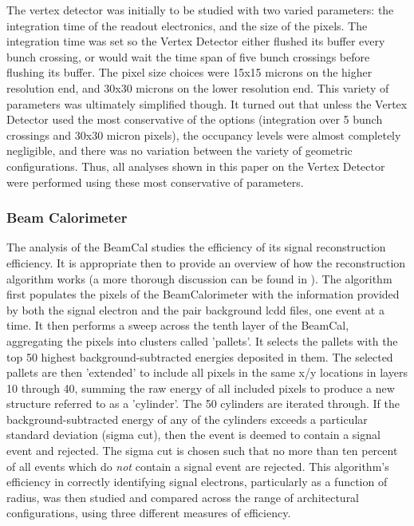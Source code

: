 \documentclass{report}
\begin{document}
                    The vertex detector was initially to be studied with two varied parameters: the integration time of the readout electronics, and the size of the pixels. The integration time was set so the Vertex Detector either flushed its buffer every bunch crossing, or would wait the time span of five bunch crossings before flushing its buffer. The pixel size choices were 15x15 microns on the higher resolution end, and 30x30 microns on the lower resolution end. This variety of parameters was ultimately simplified though. It turned out that unless the Vertex Detector used the most conservative of the options (integration over 5 bunch crossings and 30x30 micron pixels), the occupancy levels were almost completely negligible, and there was no variation between the variety of geometric configurations. Thus, all analyses shown in this paper on the Vertex Detector were performed using these most conservative of parameters.


                \subsubsection{Beam Calorimeter}
                    The analysis of the BeamCal studies the efficiency of its signal reconstruction efficiency. It is appropriate then to provide an overview of how the reconstruction algorithm works (a more thorough discussion can be found in \cite{bogert_thesis}). The algorithm first populates the pixels of the BeamCalorimeter with the information provided by both the signal electron and the pair background lcdd files, one event at a time. It then performs a sweep across the tenth layer of the BeamCal, aggregating the pixels into clusters called 'pallets'. It selects the pallets with the top 50 highest background-subtracted energies deposited in them. The selected pallets are then 'extended' to include all pixels in the same x/y locations in layers 10 through 40, summing the raw energy of all included pixels to produce a new structure referred to as a 'cylinder'. The 50 cylinders are iterated through. If the background-subtracted energy of any of the cylinders exceeds a particular standard deviation (sigma cut), then the event is deemed to contain a signal event and rejected. The sigma cut is chosen such that no more than ten percent of all events which do \textit{not} contain a signal event are rejected. This algorithm's efficiency in correctly identifying signal electrons, particularly as a function of radius, was then studied and compared across the range of architectural configurations, using three different measures of efficiency.
\end{document}
